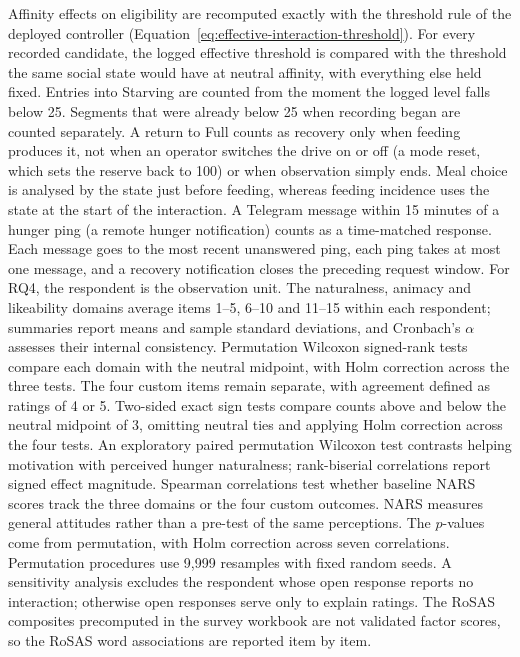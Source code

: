 Affinity effects on eligibility are recomputed exactly with the threshold rule of the deployed controller (Equation~\ref{eq:effective-interaction-threshold}). For every recorded candidate, the logged effective threshold is compared with the threshold the same social state would have at neutral affinity, with everything else held fixed.
Entries into Starving are counted from the moment the logged level falls below 25. Segments that were already below 25 when recording began are counted separately. A return to Full counts as recovery only when feeding produces it, not when an operator switches the drive on or off (a mode reset, which sets the reserve back to 100) or when observation simply ends. Meal choice is analysed by the state just before feeding, whereas feeding incidence uses the state at the start of the interaction. A Telegram message within 15 minutes of a hunger ping (a remote hunger notification) counts as a time-matched response. Each message goes to the most recent unanswered ping, each ping takes at most one message, and a recovery notification closes the preceding request window.
For RQ4, the respondent is the observation unit. The naturalness, animacy and likeability domains average items 1--5, 6--10 and 11--15 within each respondent; summaries report means and sample standard deviations, and Cronbach's $\alpha$ assesses their internal consistency. Permutation Wilcoxon signed-rank tests compare each domain with the neutral midpoint, with Holm correction across the three tests. The four custom items remain separate, with agreement defined as ratings of 4 or 5. Two-sided exact sign tests compare counts above and below the neutral midpoint of 3, omitting neutral ties and applying Holm correction across the four tests. An exploratory paired permutation Wilcoxon test contrasts helping motivation with perceived hunger naturalness; rank-biserial correlations report signed effect magnitude. Spearman correlations test whether baseline NARS scores track the three domains or the four custom outcomes. NARS measures general attitudes rather than a pre-test of the same perceptions. The $p$-values come from permutation, with Holm correction across seven correlations. Permutation procedures use 9,999 resamples with fixed random seeds. A sensitivity analysis excludes the respondent whose open response reports no interaction; otherwise open responses serve only to explain ratings. The RoSAS composites precomputed in the survey workbook are not validated factor scores, so the RoSAS word associations are reported item by item.
